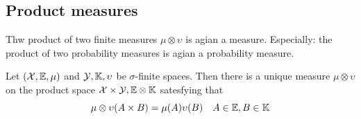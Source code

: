 \subsection{Product measures} %
\label{ssub:product_measures}
Thw product of two finite measures \(\mu\otimes\upsilon\) is agian a measure. Especially: the product of two probability measures is agian a probability measure.

\begin{them}
Let \(({\mathcal{X}},{\mathbb{E}}, \mu)\) and \({\mathcal{Y}},{\mathbb{K}}, \upsilon\) be \(\sigma\)-finite spaces. Then there is a unique measure \(\mu\otimes\upsilon\) on the product space \({\mathcal{X}}\times{\mathcal{Y}}, {\mathbb{E}}\otimes{\mathbb{K}}\) satesfying that
\[
  \mu\otimes\upsilon(A\times B)=\mu(A)\upsilon(B)\quad A\in{\mathbb{E}},B\in{\mathbb{K}}
\]

\end{them}